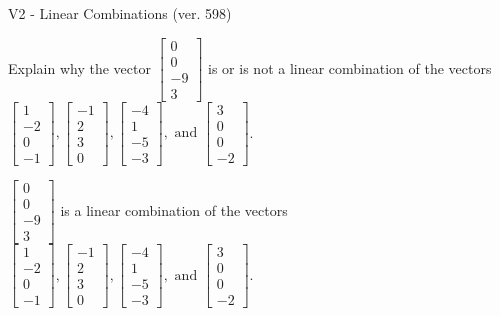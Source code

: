\begin{exercise}
  \begin{exerciseTitle}V2 - Linear Combinations (ver. 598)\end{exerciseTitle}
  \begin{exerciseStatement}
    Explain why the vector \(\left[\begin{array}{c}
0 \\
0 \\
-9 \\
3
\end{array}\right]\)  is or is not a linear 
	combination of the vectors \(\left[\begin{array}{c}
1 \\
-2 \\
0 \\
-1
\end{array}\right] , \left[\begin{array}{c}
-1 \\
2 \\
3 \\
0
\end{array}\right] , \left[\begin{array}{c}
-4 \\
1 \\
-5 \\
-3
\end{array}\right] , \text{ and } \left[\begin{array}{c}
3 \\
0 \\
0 \\
-2
\end{array}\right]\).
	


  \end{exerciseStatement}
  \begin{exerciseAnswer}
   \(\left[\begin{array}{c}
0 \\
0 \\
-9 \\
3
\end{array}\right]\) 
  	 is  
	a linear combination of the vectors \(\left[\begin{array}{c}
1 \\
-2 \\
0 \\
-1
\end{array}\right] , \left[\begin{array}{c}
-1 \\
2 \\
3 \\
0
\end{array}\right] , \left[\begin{array}{c}
-4 \\
1 \\
-5 \\
-3
\end{array}\right] , \text{ and } \left[\begin{array}{c}
3 \\
0 \\
0 \\
-2
\end{array}\right]\).


\end{exerciseAnswer}
\end{exercise}
